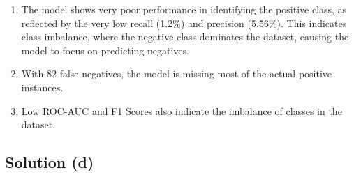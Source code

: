 \documentclass{article}
\begin{document}
\begin{enumerate}
\item The model shows very poor performance in identifying the positive class, as reflected by the very low recall (1.2\%) and precision (5.56\%). This indicates class imbalance, where the negative class dominates the dataset, causing the model to focus on predicting negatives.
\item With 82 false negatives, the model is missing most of the actual positive instances.
\item Low ROC-AUC and F1 Scores also indicate the imbalance of classes in the dataset.
\end{enumerate}

\vspace{10pt}
\subsection*{Solution (d)}
\end{document}
